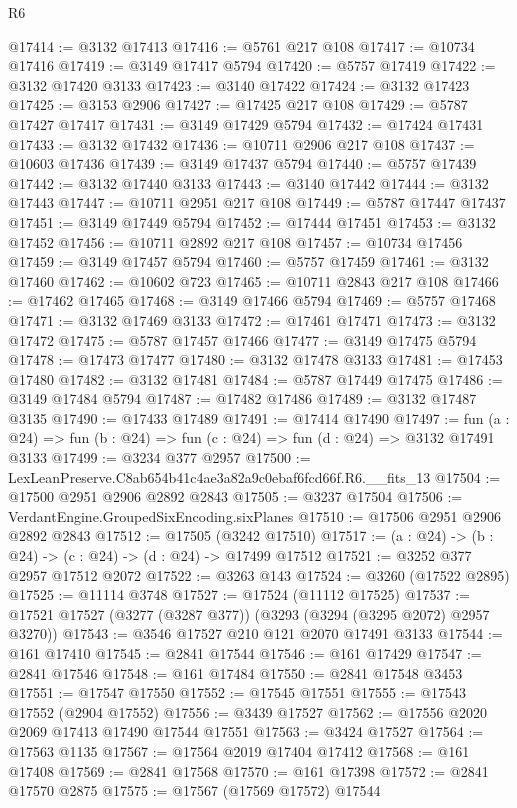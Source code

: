 \begin{lexlean}{R6}
\begin{coremodule}
@17414 := @3132 @17413
@17416 := @5761 @217 @108
@17417 := @10734 @17416
@17419 := @3149 @17417 @5794
@17420 := @5757 @17419
@17422 := @3132 @17420 @3133
@17423 := @3140 @17422
@17424 := @3132 @17423
@17425 := @3153 @2906
@17427 := @17425 @217 @108
@17429 := @5787 @17427 @17417
@17431 := @3149 @17429 @5794
@17432 := @17424 @17431
@17433 := @3132 @17432
@17436 := @10711 @2906 @217 @108
@17437 := @10603 @17436
@17439 := @3149 @17437 @5794
@17440 := @5757 @17439
@17442 := @3132 @17440 @3133
@17443 := @3140 @17442
@17444 := @3132 @17443
@17447 := @10711 @2951 @217 @108
@17449 := @5787 @17447 @17437
@17451 := @3149 @17449 @5794
@17452 := @17444 @17451
@17453 := @3132 @17452
@17456 := @10711 @2892 @217 @108
@17457 := @10734 @17456
@17459 := @3149 @17457 @5794
@17460 := @5757 @17459
@17461 := @3132 @17460
@17462 := @10602 @723
@17465 := @10711 @2843 @217 @108
@17466 := @17462 @17465
@17468 := @3149 @17466 @5794
@17469 := @5757 @17468
@17471 := @3132 @17469 @3133
@17472 := @17461 @17471
@17473 := @3132 @17472
@17475 := @5787 @17457 @17466
@17477 := @3149 @17475 @5794
@17478 := @17473 @17477
@17480 := @3132 @17478 @3133
@17481 := @17453 @17480
@17482 := @3132 @17481
@17484 := @5787 @17449 @17475
@17486 := @3149 @17484 @5794
@17487 := @17482 @17486
@17489 := @3132 @17487 @3135
@17490 := @17433 @17489
@17491 := @17414 @17490
@17497 := fun (a : @24) => fun (b : @24) => fun (c : @24) => fun (d : @24) => @3132 @17491 @3133
@17499 := @3234 @377 @2957
@17500 := LexLeanPreserve.C8ab654b41c4ae3a82a9c0ebaf6fcd66f.R6.__fits_13
@17504 := @17500 @2951 @2906 @2892 @2843
@17505 := @3237 @17504
@17506 := VerdantEngine.GroupedSixEncoding.sixPlanes
@17510 := @17506 @2951 @2906 @2892 @2843
@17512 := @17505 (@3242 @17510)
@17517 := (a : @24) -> (b : @24) -> (c : @24) -> (d : @24) -> @17499 @17512
@17521 := @3252 @377 @2957 @17512 @2072
@17522 := @3263 @143
@17524 := @3260 (@17522 @2895)
@17525 := @11114 @3748
@17527 := @17524 (@11112 @17525)
@17537 := @17521 @17527 (@3277 (@3287 @377)) (@3293 (@3294 (@3295 @2072) @2957 @3270))
@17543 := @3546 @17527 @210 @121 @2070 @17491 @3133
@17544 := @161 @17410
@17545 := @2841 @17544
@17546 := @161 @17429
@17547 := @2841 @17546
@17548 := @161 @17484
@17550 := @2841 @17548 @3453
@17551 := @17547 @17550
@17552 := @17545 @17551
@17555 := @17543 @17552 (@2904 @17552)
@17556 := @3439 @17527
@17562 := @17556 @2020 @2069 @17413 @17490 @17544 @17551
@17563 := @3424 @17527
@17564 := @17563 @1135
@17567 := @17564 @2019 @17404 @17412
@17568 := @161 @17408
@17569 := @2841 @17568
@17570 := @161 @17398
@17572 := @2841 @17570 @2875
@17575 := @17567 (@17569 @17572) @17544

\end{coremodule}
\end{lexlean}
